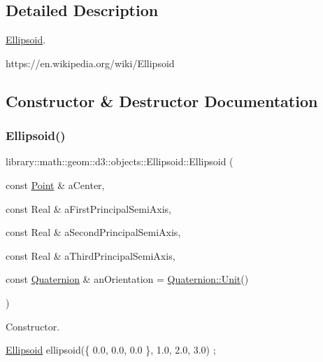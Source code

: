 \subsection{Detailed Description}
\hyperlink{classlibrary_1_1math_1_1geom_1_1d3_1_1objects_1_1_ellipsoid}{Ellipsoid}. 

https\+://en.wikipedia.\+org/wiki/\+Ellipsoid 

\subsection{Constructor \& Destructor Documentation}
\mbox{\label{classlibrary_1_1math_1_1geom_1_1d3_1_1objects_1_1_ellipsoid_aae81fe0edc7f0e8d4590ea89ae73cb14}} 
\subsubsection{\texorpdfstring{Ellipsoid()}{Ellipsoid()}}
{\footnotesize\ttfamily library\+::math\+::geom\+::d3\+::objects\+::\+Ellipsoid\+::\+Ellipsoid (\begin{DoxyParamCaption}\item[{const \hyperlink{classlibrary_1_1math_1_1geom_1_1d3_1_1objects_1_1_point}{Point} \&}]{a\+Center,  }\item[{const Real \&}]{a\+First\+Principal\+Semi\+Axis,  }\item[{const Real \&}]{a\+Second\+Principal\+Semi\+Axis,  }\item[{const Real \&}]{a\+Third\+Principal\+Semi\+Axis,  }\item[{const \hyperlink{classlibrary_1_1math_1_1geom_1_1d3_1_1trf_1_1rot_1_1_quaternion}{Quaternion} \&}]{an\+Orientation = {\ttfamily \hyperlink{classlibrary_1_1math_1_1geom_1_1d3_1_1trf_1_1rot_1_1_quaternion_a8076524c66a805b16dffc27efd11e245}{Quaternion\+::\+Unit}()} }\end{DoxyParamCaption})}



Constructor. 


\begin{DoxyCode}
\hyperlink{classlibrary_1_1math_1_1geom_1_1d3_1_1objects_1_1_ellipsoid_aae81fe0edc7f0e8d4590ea89ae73cb14}{Ellipsoid} ellipsoid(\{ 0.0, 0.0, 0.0 \}, 1.0, 2.0, 3.0) ;
\end{DoxyCode}



